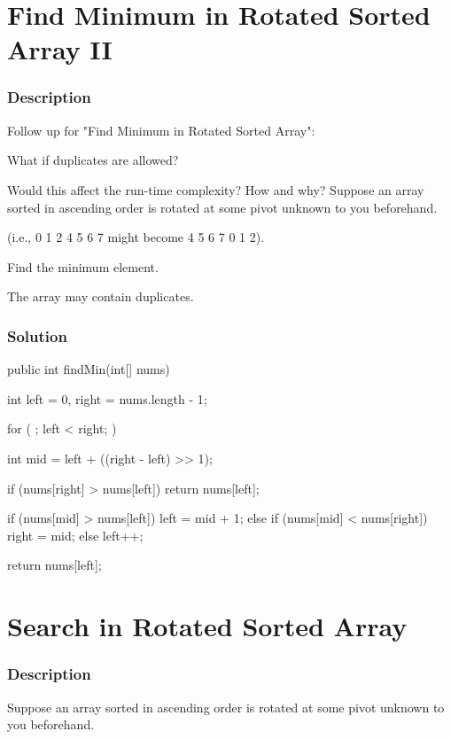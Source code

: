 \newpage

\section{Find Minimum in Rotated Sorted Array II} %

\subsubsection{Description}
Follow up for "Find Minimum in Rotated Sorted Array":

What if duplicates are allowed?

Would this affect the run-time complexity? How and why?
Suppose an array sorted in ascending order is rotated at some pivot unknown to you beforehand.

(i.e., 0 1 2 4 5 6 7 might become 4 5 6 7 0 1 2).

Find the minimum element.

The array may contain duplicates.

\subsubsection{Solution}

\begin{Code}
public int findMin(int[] nums) {
    int left = 0, right = nums.length - 1;

    for ( ; left < right; ) {
        int mid = left + ((right - left) >> 1);

        if (nums[right] > nums[left]) {
            return nums[left];
        }

        if (nums[mid] > nums[left]) {
            left = mid + 1;
        } else if (nums[mid] < nums[right]) {
            right = mid;
        } else {
            left++;
        }
    }

    return nums[left];
}
\end{Code}

\newpage

\section{Search in Rotated Sorted Array} %

\subsubsection{Description}
Suppose an array sorted in ascending order is rotated at some pivot unknown to you beforehand.

